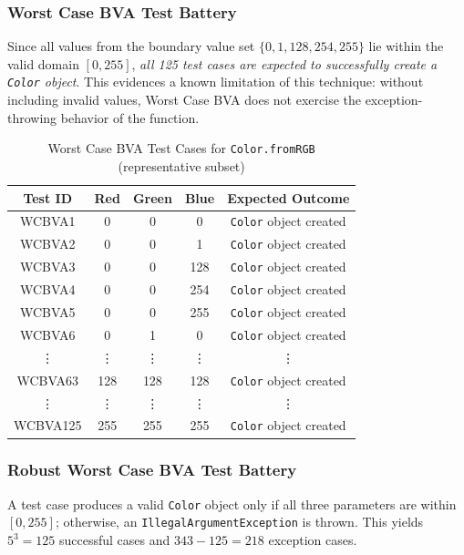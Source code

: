 \documentclass[11pt, a4paper]{article}
\begin{document}
\subsubsection{Worst Case BVA Test Battery}
Since all values from the boundary value set $\{0, 1, 128, 254, 255\}$ lie
within the valid domain $[0, 255]$, \emph{all 125 test cases are expected to
successfully create a \texttt{Color} object}. This evidences a known limitation
of this technique: without including invalid values, Worst Case BVA does not
exercise the exception-throwing behavior of the function. %

\begin{table}[H]
\centering
\caption{Worst Case BVA Test Cases for \texttt{Color.fromRGB} (representative subset)}
\label{tab:color_worst_case_bva}
\begin{tabular}{ccccc}
\toprule
\textbf{Test ID} & \textbf{Red} & \textbf{Green} & \textbf{Blue} & \textbf{Expected Outcome} \\
\midrule
WCBVA1   & 0   & 0   & 0   & \texttt{Color} object created \\
WCBVA2   & 0   & 0   & 1   & \texttt{Color} object created \\
WCBVA3   & 0   & 0   & 128 & \texttt{Color} object created \\
WCBVA4   & 0   & 0   & 254 & \texttt{Color} object created \\
WCBVA5   & 0   & 0   & 255 & \texttt{Color} object created \\
WCBVA6   & 0   & 1   & 0   & \texttt{Color} object created \\
\vdots   & \vdots & \vdots & \vdots & \vdots \\
WCBVA63  & 128 & 128 & 128 & \texttt{Color} object created \\
\vdots   & \vdots & \vdots & \vdots & \vdots \\
WCBVA125 & 255 & 255 & 255 & \texttt{Color} object created \\
\bottomrule
\end{tabular}
\end{table}

\subsubsection{Robust Worst Case BVA Test Battery}
A test case produces a valid \texttt{Color} object only if all three parameters
are within $[0, 255]$; otherwise, an \texttt{IllegalArgumentException} is
thrown. This yields $5^3 = 125$ successful cases and $343 - 125 = 218$ exception
cases.
\end{document}
